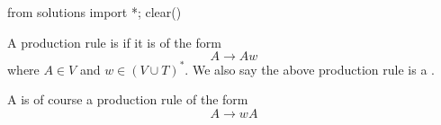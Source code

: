\begin{python0}
from solutions import *; clear()
\end{python0}

A production rule is
if it is of the form
\[
A \rightarrow A w
\]
where $A \in V$ and $w \in (V \cup T)^*$.
We also say the above production rule is a
.

A 
is of course a production rule of the form
\[
A \rightarrow wA
\]
